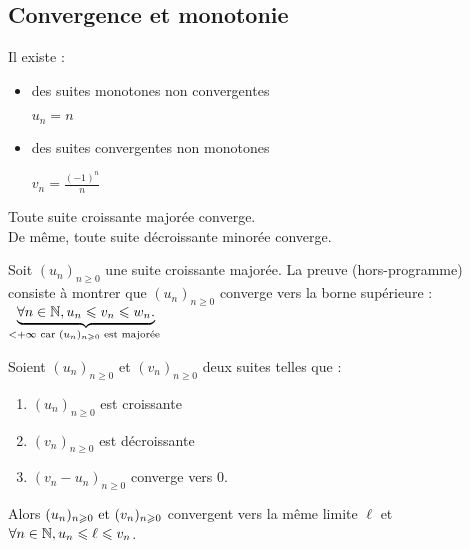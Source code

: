 \subsection{Convergence et monotonie}
Il existe : 
\begin{itemize}
    \item des suites monotones non convergentes
    \begin{exemple}
        $u_n = n$
    \end{exemple}
    
    \item des suites convergentes non monotones
    \begin{exemple}
        $v_n = \frac{(-1)^n}{n}$
    \end{exemple}
\end{itemize}

\begin{graybox}
    \begin{theoreme}[]
    Toute suite croissante majorée converge. 
    \\
    De même, toute suite décroissante minorée converge.
\end{theoreme}
\end{graybox}

\begin{remarque}
    Soit $(u_n)_{n \geq 0}$ une suite croissante majorée. 
    La preuve (hors-programme) consiste à montrer que $(u_n)_{n \geq 0}$ converge vers la borne supérieure : $\underbrace{\forall n \in \N, u_n \leq v_n \leq w_n.}_{< +\infty \textnormal{ car }(u_n)_{n \geq 0} \textnormal{ est majorée }}$
\end{remarque}

\begin{graybox}
    \begin{theoreme}
    Soient $(u_n)_{n \geq 0}$ et $(v_n)_{n \geq 0}$ deux suites telles que :
    \begin{enumerate}
        \item $(u_n)_{n \geq 0}$ est croissante
        \item $(v_n)_{n \geq 0}$ est décroissante
        \item $(v_n - u_n)_{n \geq 0}$ converge vers 0.
    \end{enumerate}
    Alors $(u_n)_{n \geq 0} \textnormal{ et } (v_n)_{n \geq 0}$ convergent vers la même limite $\ell$ et $\forall n \in \N, u_n \leq \ell \leq v_n$.
\end{theoreme}
\end{graybox}

